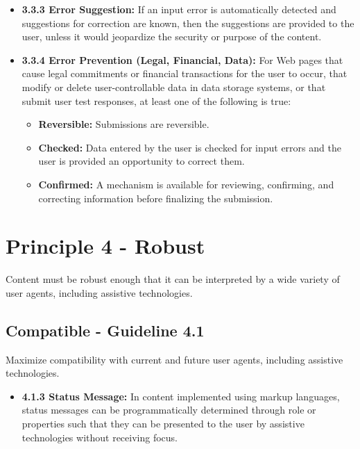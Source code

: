 \documentclass[
  letterpaper,
  DIV=11,
  numbers=noendperiod]{scrartcl}
\providecommand{\tightlist}{%
  \setlength{\itemsep}{0pt}\setlength{\parskip}{0pt}}\usepackage{longtable,booktabs,array}
\begin{document}
\begin{itemize}
\item
  \textbf{3.3.3 Error Suggestion:} If an input error is automatically
  detected and suggestions for correction are known, then the
  suggestions are provided to the user, unless it would jeopardize the
  security or purpose of the content.
\item
  \textbf{3.3.4 Error Prevention (Legal, Financial, Data):} For Web
  pages that cause legal commitments or financial transactions for the
  user to occur, that modify or delete user-controllable data in data
  storage systems, or that submit user test responses, at least one of
  the following is true:

  \begin{itemize}
  \tightlist
  \item
    \textbf{Reversible:} Submissions are reversible.
  \item
    \textbf{Checked:} Data entered by the user is checked for input
    errors and the user is provided an opportunity to correct them.
  \item
    \textbf{Confirmed:} A mechanism is available for reviewing,
    confirming, and correcting information before finalizing the
    submission.
  \end{itemize}
\end{itemize}

\section{Principle 4 - Robust}\label{principle-4---robust}

Content must be robust enough that it can be interpreted by a wide
variety of user agents, including assistive technologies.

\subsection{Compatible - Guideline
4.1}\label{compatible---guideline-4.1}

Maximize compatibility with current and future user agents, including
assistive technologies.

\begin{itemize}
\tightlist
\item
  \textbf{4.1.3 Status Message:} In content implemented using markup
  languages, status messages can be programmatically determined through
  role or properties such that they can be presented to the user by
  assistive technologies without receiving focus.
\end{itemize}
\end{document}
